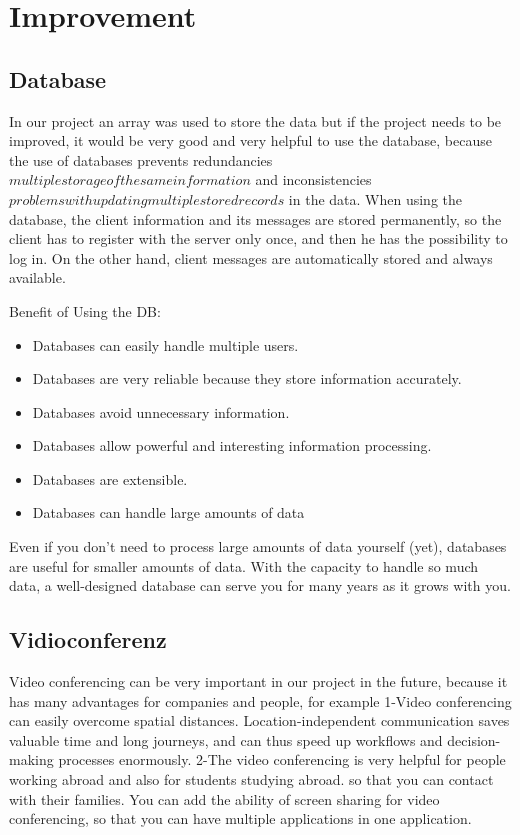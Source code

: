 \chapter{Improvement}\label{ch:improvement}


\section{Database}\label{sec:database}
In our project an array was used to store the data
but if the project needs to be improved, it would be very good and very helpful to use the database,
because the use of databases prevents redundancies \(multiple storage of the same information\) and
inconsistencies \(problems with updating multiple stored records\) in the data.
When using the database, the client information and its messages are stored permanently, so the
client has to register with the server only once, and then he has the possibility to log in.
On the other hand, client messages are automatically stored and always available.

Benefit of Using the DB:
\begin{itemize}
    \item Databases can easily handle multiple users.
    \item Databases are very reliable because they store information accurately.
    \item Databases avoid unnecessary information.
    \item Databases allow powerful and interesting information processing.
    \item Databases are extensible.
    \item Databases can handle large amounts of data
\end{itemize}
\noindent
Even if you don't need to process large amounts of data yourself (yet), databases are useful for
smaller amounts of data. With the capacity to handle so much data, a well-designed database can
serve you for many years as it grows with you.

\section {Vidioconferenz }\label{sec:Vidioconferenz}
Video conferencing can be very important in our project in the future, because it has many advantages
for companies and people, for example 
1-Video conferencing can easily overcome spatial distances. Location-independent communication
saves valuable time and long journeys, and can thus speed up workflows and decision-making processes
enormously.
2-The video conferencing is very helpful for people working abroad and also for students studying abroad.
so that you can contact with their families. 
You can add the ability of screen sharing for video conferencing, so that you can have multiple applications
in one application.

